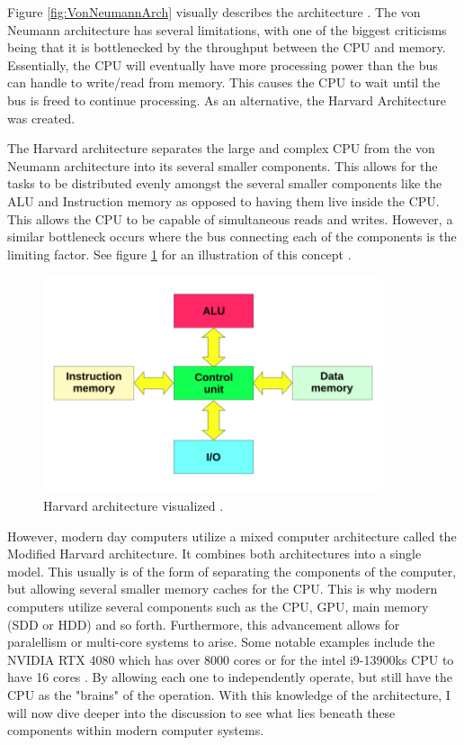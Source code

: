 Figure \ref{fig:VonNeumannArch} visually describes the architecture \cite{vonNeumannImg}.
The von Neumann architecture has several limitations, with one of the biggest criticisms being that it is bottlenecked by the throughput between the CPU and memory.
Essentially, the CPU will eventually have more processing power than the bus can handle to write/read from memory.
This causes the CPU to wait until the bus is freed to continue processing.
As an alternative, the Harvard Architecture was created.

The Harvard architecture separates the large and complex CPU from the von Neumann architecture into its several smaller components.
This allows for the tasks to be distributed evenly amongst the several smaller components like the ALU and Instruction memory as opposed to having them live inside the CPU.
This allows the CPU to be capable of simultaneous reads and writes.
However, a similar bottleneck occurs where the bus connecting each of the components is the limiting factor.
See figure \ref{fig:HarvardArch} for an illustration of this concept \cite{HarvardArchImg}.

\begin{figure}[htb]
    \centering
    \includegraphics[width=10cm]{Images/Harvard_architecture.svg.png}
       \caption{Harvard architecture visualized \cite{HarvardArchImg}.}
           \label{fig:HarvardArch}
\end{figure}

However, modern day computers utilize a mixed computer architecture called the Modified Harvard architecture.
It combines both architectures into a single model.
This usually is of the form of separating the components of the computer, but allowing several smaller memory caches for the CPU.
This is why modern computers utilize several components such as the CPU, GPU, main memory (SDD or HDD) and so forth.
Furthermore, this advancement allows for paralellism or multi-core systems to arise.
Some notable examples include the NVIDIA RTX 4080 which has over 8000 cores or for the intel i9-13900ks CPU to have 16 cores \cite{4080Specs,IntelSpecs}.
By allowing each one to independently operate, but still have the CPU as the "brains" of the operation.
With this knowledge of the architecture, I will now dive deeper into the discussion to see what lies beneath these components within modern computer systems.

